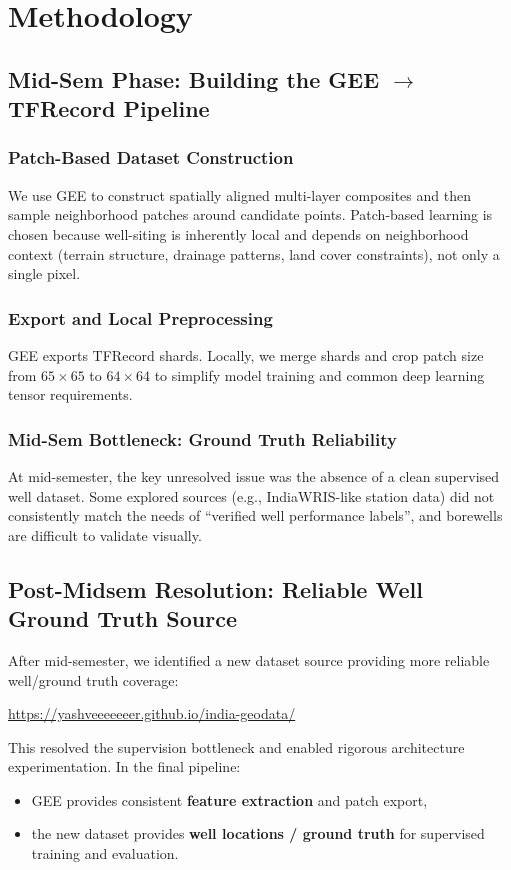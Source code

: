 \documentclass[12pt,a4paper]{report}
\begin{document}
\chapter{Methodology}

\section{Mid-Sem Phase: Building the GEE \texorpdfstring{$\rightarrow$}{->} TFRecord Pipeline}
\subsection{Patch-Based Dataset Construction}
We use GEE to construct spatially aligned multi-layer composites and then sample neighborhood patches around candidate points. Patch-based learning is chosen because well-siting is inherently local and depends on neighborhood context (terrain structure, drainage patterns, land cover constraints), not only a single pixel.

\subsection{Export and Local Preprocessing}
GEE exports TFRecord shards. Locally, we merge shards and crop patch size from \(65\times65\) to \(64\times64\) to simplify model training and common deep learning tensor requirements.

\subsection{Mid-Sem Bottleneck: Ground Truth Reliability}
At mid-semester, the key unresolved issue was the absence of a clean supervised well dataset. Some explored sources (e.g., IndiaWRIS-like station data) did not consistently match the needs of ``verified well performance labels'', and borewells are difficult to validate visually.

\section{Post-Midsem Resolution: Reliable Well Ground Truth Source}
After mid-semester, we identified a new dataset source providing more reliable well/ground truth coverage:
\begin{center}
\url{https://yashveeeeeeer.github.io/india-geodata/}
\end{center}
This resolved the supervision bottleneck and enabled rigorous architecture experimentation. In the final pipeline:
\begin{itemize}
  \item GEE provides consistent \textbf{feature extraction} and patch export,
  \item the new dataset provides \textbf{well locations / ground truth} for supervised training and evaluation.
\end{itemize}
\end{document}
